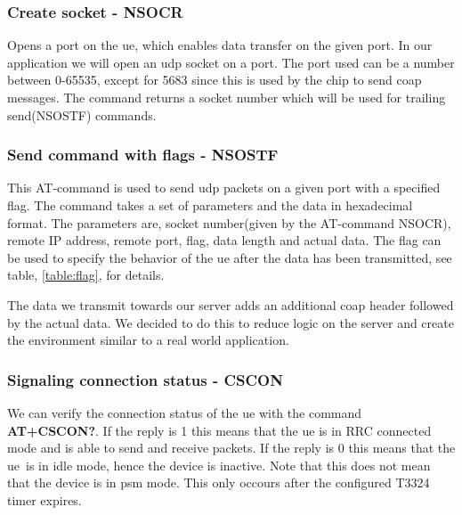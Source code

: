 \documentclass[USenglish]{ifimaster}  %
\begin{document}
\subsubsection{Create socket - NSOCR}
Opens a port on the \acrshort{ue}, which enables data transfer on the given port. In our application we will open an \acrshort{udp} socket on a port. The port used can be a number between 0-65535, except for 5683 since this is used by the chip to send \acrshort{coap} messages. The command returns a socket number which will be used for trailing send(NSOSTF) commands.

\subsubsection{Send command with flags - NSOSTF}
This AT-command is used to send \acrshort{udp} packets on a given port with a specified flag. The command takes a set of parameters and the data in hexadecimal format. The parameters are, socket number(given by the AT-command NSOCR), remote IP address, remote port, flag, data length and actual data. The flag can be used to specify the behavior of the \acrshort{ue} after the data has been transmitted, see table, \vref{table:flag}, for details.

\begin{table}[H]
\centering
{}
\caption{Transmit flags}
\label{table:flag}
\end{table}

The data we transmit towards our server adds an additional \acrshort{coap} header followed by the actual data. We decided to do this to reduce logic on the server and create the environment similar to a real world application.

\subsubsection{Signaling connection status - CSCON}
We can verify the connection status of the \acrshort{ue} with the command \textbf{AT+CSCON?}. If the reply is 1 this means that the \acrshort{ue} is in RRC connected mode and is able to send and receive packets. If the reply is 0 this means that the \acrshort{ue} is in idle mode, hence the device is inactive. Note that this does not mean that the device is in \acrshort{psm} mode. This only occours after the configured \acrshort{T3324} timer expires.
\end{document}
